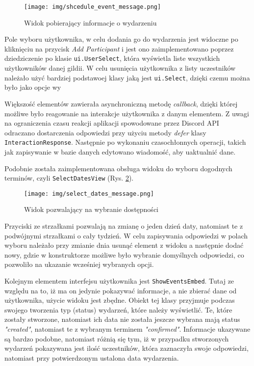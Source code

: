 \documentclass[12pt,a4paper]{article}
\newcommand{\classname}[1]{\texttt{#1}}
\begin{document}
\begin{figure}[H]
    \centering
    \texttt{[image: img/shcedule\_event\_message.png]}
    \caption{Widok pobierający informacje o wydarzeniu}
    \label{img: schedule_event_view}
\end{figure}

Pole wyboru użytkownika, w celu dodania go do wydarzenia jest widoczne po kliknięciu na przycisk \textit{Add Participant} i jest ono zaimplementowano poprzez dziedziczenie po klasie \classname{ui.UserSelect}, która wyświetla liste wszystkich użytkowników danej gildii. W celu usunięcia użytkownika z listy uczestników należało użyć bardziej podstawoej klasy jaką jest \classname{ui.Select}, dzięki czemu można było jako opcje wy

Większość elementów zawierała asynchroniczną metodę \textit{callback}, dzięki której możliwe było reagowanie na interakcje użytkownika z danym elementem. Z uwagi na ograniczenia czasu reakcji aplikacji spowodowane przez Discord API odraczano dostarczenia odpowiedzi przy użyciu metody \textit{defer} klasy \classname{InteractionResponse}. Następnie po wykonaniu czasochłonnych operacji, takich jak zapisywanie w bazie danych edytowano wiadomość, aby uaktualnić dane.

Podobnie została zaimplementowana obsługa widoku do wyboru dogodnych terminów, czyli \classname{SelectDatesView} (Rys. \ref{img: select_dates_view}).

\begin{figure}[H]
    \centering
    \texttt{[image: img/select\_dates\_message.png]}
    \caption{Widok pozwalający na wybranie dostępności}
    \label{img: select_dates_view}
\end{figure}

Przyciski ze strzałkami pozwalają na zmianę o jeden dzień daty, natomiast te z podwójnymi strzałkami o cały tydzień. W celu zapisywania odpowiedzi w polach wyboru należało przy zmianie dnia usunąć element z widoku a następnie dodać nowy, gdzie w konstruktorze możliwe było wybranie domyślnych odpowiedzi, co pozwoliło na ukazanie wcześniej wybranych opcji.

Kolejnym elementem interfejsu użytkownika jest \classname{ShowEventsEmbed}. Tutaj ze względu na to, iż ma on jedynie pokazywać informacje, a nie zbierać dane od użytkownika, użycie widoku jest zbędne. Obiekt tej klasy przyjmuje podczas swojego tworzenia typ (status) wydarzeń, które należy wyświetlić. Te, które zostały stworzone, natomiast ich data nie została jeszcze wybrana mają status \textit{"created"}, natomiast te z wybranym terminem \textit{"confirmed"}. Informacje ukazywane są bardzo podobne, natomiast różnią się tym, iż w przypadku stworzonych wydarzeń pokazywana jest ilość uczestników, która zaznaczyła swoje odpowiedzi, natomiast przy potwierdzonym ustalona data wydarzenia.
\end{document}
